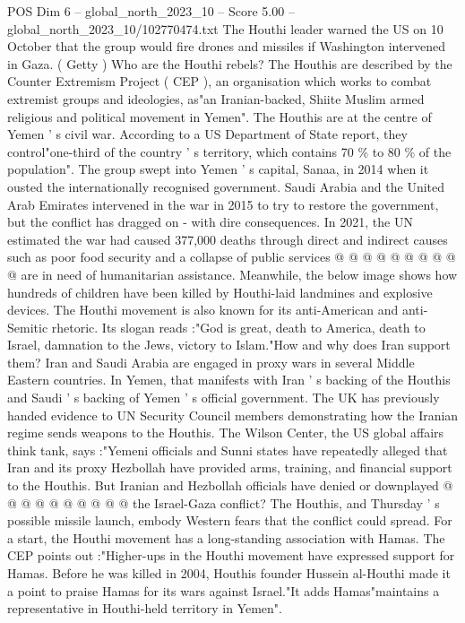 \begin{textsample}{POS Dim 6 – global\_north\_2023\_10 – Score 5.00 – global\_north\_2023\_10/102770474.txt}  \label{ex:f6_pos_206}
The Houthi leader warned the US on 10 October that the group would fire drones and missiles if Washington intervened in Gaza. ( Getty ) Who are the Houthi rebels?
The Houthis are described by the Counter Extremism Project ( CEP ), an organisation which works to combat extremist groups and ideologies, as"an Iranian-backed, Shiite Muslim armed religious and political movement in Yemen".
The Houthis are at the centre of Yemen ' s civil war.
According to a US Department of State report, they control"one-third of the country ' s territory, which contains 70 \% to 80 \% of the population".
The group swept into Yemen ' s capital, Sanaa, in 2014 when it ousted the internationally recognised government.
Saudi Arabia and the United Arab Emirates intervened in the war in 2015 to try to restore the government, but the conflict has dragged on - with dire consequences.
In 2021, the UN estimated the war had caused 377,000 deaths through direct and indirect causes such as poor food security and a collapse of public services @ @ @ @ @ @ @ @ @ @ are in need of humanitarian assistance.
Meanwhile, the below image shows how hundreds of children have been killed by Houthi-laid landmines and explosive devices.
The Houthi movement is also known for its anti-American and anti-Semitic rhetoric.
Its slogan reads :"God is great, death to America, death to Israel, damnation to the Jews, victory to Islam."How and why does Iran support them?
Iran and Saudi Arabia are engaged in proxy wars in several Middle Eastern countries.
In Yemen, that manifests with Iran ' s backing of the Houthis and Saudi ' s backing of Yemen ' s official government.
The UK has previously handed evidence to UN Security Council members demonstrating how the Iranian regime sends weapons to the Houthis.
The Wilson Center, the US global affairs think tank, says :"Yemeni officials and Sunni states have repeatedly alleged that Iran and its proxy Hezbollah have provided arms, training, and financial support to the Houthis.
But Iranian and Hezbollah officials have denied or downplayed @ @ @ @ @ @ @ @ @ @ the Israel-Gaza conflict?
The Houthis, and Thursday ' s possible missile launch, embody Western fears that the conflict could spread.
For a start, the Houthi movement has a long-standing association with Hamas.
The CEP points out :"Higher-ups in the Houthi movement have expressed support for Hamas.
Before he was killed in 2004, Houthis founder Hussein al-Houthi made it a point to praise Hamas for its wars against Israel."It adds Hamas"maintains a representative in Houthi-held territory in Yemen".

\end{textsample}
